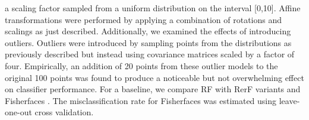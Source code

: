 \documentclass{article} %
\begin{document}
a scaling factor sampled from a uniform distribution on the interval [0,10]. 
Affine transformations were performed by applying a combination of rotations and scalings as just described. Additionally, we examined the effects of introducing outliers. Outliers were introduced by sampling points from the distributions as previously described but instead using covariance matrices scaled by a factor of four. Empirically, an addition of 20 points from these outlier models to the original 100 points was found to produce a noticeable but not overwhelming effect on classifier performance. For a baseline, we compare RF with RerF variants and Fisherfaces \cite{Fisherfaces}. The misclassification rate for Fisherfaces was estimated using leave-one-out cross validation. 
\end{document}
